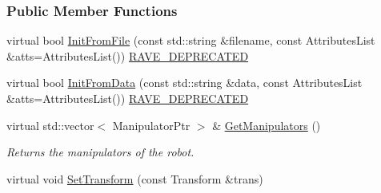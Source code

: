 \subsubsection*{Public Member Functions}
\begin{DoxyCompactItemize}
\item 
virtual bool \hyperlink{classOpenRAVE_1_1RobotBase_ae67a1ee5e11749340bfbca5bd6749424}{InitFromFile} (const std::string \&filename, const AttributesList \&atts=AttributesList()) \hyperlink{classOpenRAVE_1_1RobotBase_ad7131b2e388f7f953e9cc14f7336c8e2}{RAVE\_\-DEPRECATED}
\item 
virtual bool \hyperlink{classOpenRAVE_1_1RobotBase_a3f81f529c6959894555ad8841a134431}{InitFromData} (const std::string \&data, const AttributesList \&atts=AttributesList()) \hyperlink{classOpenRAVE_1_1RobotBase_ad7131b2e388f7f953e9cc14f7336c8e2}{RAVE\_\-DEPRECATED}
\item 
\hypertarget{classOpenRAVE_1_1RobotBase_a93fa4dbd84cc30d4dae78ee20d816ce3}{
virtual std::vector$<$ ManipulatorPtr $>$ \& \hyperlink{classOpenRAVE_1_1RobotBase_a93fa4dbd84cc30d4dae78ee20d816ce3}{GetManipulators} ()}
\label{classOpenRAVE_1_1RobotBase_a93fa4dbd84cc30d4dae78ee20d816ce3}

\begin{DoxyCompactList}\small\item\em Returns the manipulators of the robot. \item\end{DoxyCompactList}\item 
\hypertarget{classOpenRAVE_1_1RobotBase_ad19fd054ec0bb506ca08d1a7deaa005d}{
virtual void \hyperlink{classOpenRAVE_1_1RobotBase_ad19fd054ec0bb506ca08d1a7deaa005d}{SetTransform} (const Transform \&trans)}
\label{classOpenRAVE_1_1RobotBase_ad19fd054ec0bb506ca08d1a7deaa005d}


\end{DoxyCompactItemize}
